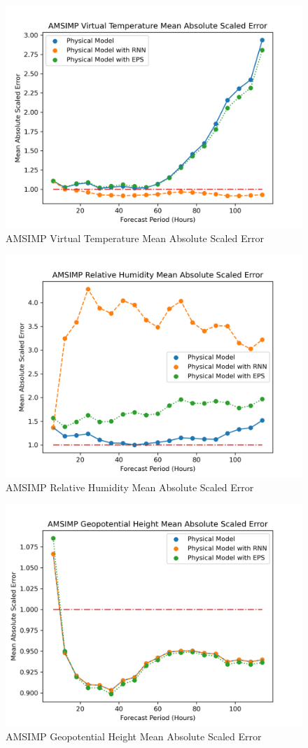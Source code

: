 \begin{figure}[H]
    \centering
    \includegraphics[width=.7\linewidth]{Graphs/accuracy/mase/virtual_temperature.png}
    \caption{AMSIMP Virtual Temperature Mean Absolute Scaled Error}
\end{figure}

\begin{figure}[H]
    \centering
    \includegraphics[width=.8\linewidth]{Graphs/accuracy/mase/relative_humidity.png}
    \caption{AMSIMP Relative Humidity Mean Absolute Scaled Error}
\end{figure}

\begin{figure}[H]
    \centering
    \includegraphics[width=.8\linewidth]{Graphs/accuracy/mase/geopotential_height.png}
    \caption{AMSIMP Geopotential Height Mean Absolute Scaled Error}
\end{figure}


